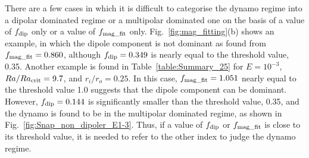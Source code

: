 
{\color{green}
There are a few cases in which it is difficult to categorise the dynamo regime into a dipolar dominated regime or a multipolar dominated one on the basis of a value of $f_{\rm dip}$ only or a value of $f_{\rm mag\_fit}$ only.
Fig.~\ref{fig:mag_fitting}(b) shows an example, in which the dipole component is not dominant as found from $f_{\rm mag\_fit} = 0.860$, although $f_{\rm dip} = 0.349$ is nearly equal to the threshold value, 0.35.
Another example is found in Table~\ref{table:Summary_25} for $E = 10^{-3}$, $Ra / Ra_{\rm crit} = 9.7$, and $r_i / r_o = 0.25$.
In this case, $f_{\rm mag\_fit} = 1.051$ nearly equal to the threshold value 1.0 suggests that the dipole component can be dominant.
However, $f_{\rm dip} = 0.144$ is significantly smaller than the threshold value, 0.35, and the dynamo is found to be in the multipolar dominated regime, as shown in Fig.~\ref{fig:Snap_non_dipoler_E1-3}.
Thus, if a value of $f_{\rm dip}$ or $f_{\rm mag\_fit}$ is close to its threshold value, it is needed to refer to the other index to judge the dynamo regime.
}



